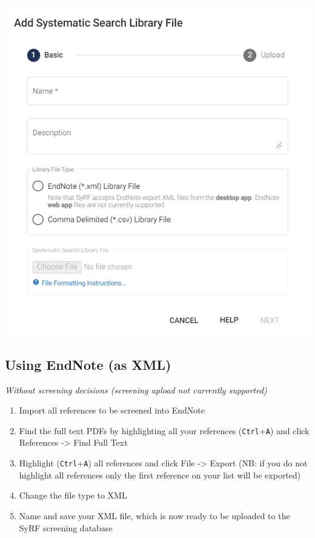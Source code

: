 \documentclass[
]{book}
\providecommand{\tightlist}{%
  \setlength{\itemsep}{0pt}\setlength{\parskip}{0pt}}
\begin{document}
\includegraphics[width=1\textwidth,height=1\textheight]{figs/Fig_Upload_search.png}

\hypertarget{using-endnote-as-xml}{%
\subsection{Using EndNote (as XML)}\label{using-endnote-as-xml}}

\emph{Without screening decisions (screening upload not currently supported)}

\begin{enumerate}
\def\labelenumi{\arabic{enumi}.}
\tightlist
\item
  Import all references to be screened into EndNote
\item
  Find the full text PDFs by highlighting all your references (\texttt{Ctrl}+\texttt{A}) and click References -\textgreater{} Find Full Text
\item
  Highlight (\texttt{Ctrl}+\texttt{A}) all references and click File -\textgreater{} Export (NB: if you do not highlight all references only the first reference on your list will be exported)
\item
  Change the file type to XML
\item
  Name and save your XML file, which is now ready to be uploaded to the SyRF screening database
\end{enumerate}
\end{document}
